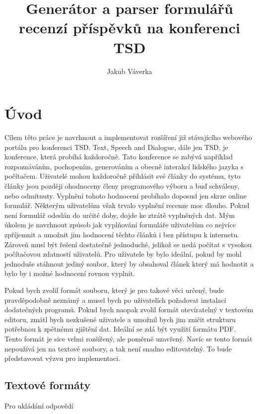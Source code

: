 \documentclass[czech,BP]{thesiskiv}
\author{Jakub Váverka}
\title{Generátor a parser formulářů recenzí příspěvků na konferenci TSD}
\begin{document}
%
\maketitle
\tableofcontents

\chapter{Úvod}
Cílem této práce je navrhnout a implementovat rozšíření již stávajícího webového portálu pro konferenci TSD. Text, Speech and Dialogue, dále jen TSD, je konference, která probíhá každoročně. Tato konference se zabývá například rozpoznáváním, pochopením, generováním a obecně interakcí lidského jazyka s počítačem. Uživatelé mohou každoročně přihlásit své články do systému, tyto články jsou později ohodnoceny členy programového výboru a buď schváleny, nebo odmítnuty. Vyplnění tohoto hodnocení probíhalo doposud jen skrze online formulář. Některým uživatelům však trvalo vyplnění recenze moc dlouho. Pokud není formulář odeslán do určité doby, dojde ke ztrátě vyplněných dat. Mým úkolem je navrhnout způsob jak vyplňování formuláře uživatelům co nejvíce zpříjemnit a umožnit jim hodnocení těchto článků i bez přístupu k internetu. Zároveň musí být řešení dostatečně jednoduché, jelikož se nedá počítat s vysokou počítačovou zdatností uživatelů. Pro uživatele by bylo ideální, pokud by mohl jednoduše stáhnout jediný soubor, který by obsahoval článek který má hodnotit a bylo by i možné hodnocení rovnou vyplnit.

Pokud bych zvolil formát souboru, který je pro takové věci určený, bude pravděpodobně neznámý a musel bych po uživatelích požadovat instalaci dodatečných programů. Pokud bych naopak zvolil formát otevíratelný v textovém editoru, zmátl bych nezkušené uživatele a umožnil bych jim zničit strukturu potřebnou k zpětnému zjištění dat. Ideální se zdá být využití formátu PDF. Tento formát je sice velmi rozšířený, ale poměrně uzavřený. Navíc se tento formát nepoužívá jen na textové soubory, a tak není snadno editovatelný. To bude představovat výzvu pro implementaci.

\section{Textové formáty}
Pro ukládání odpovědí 
\end{document}
